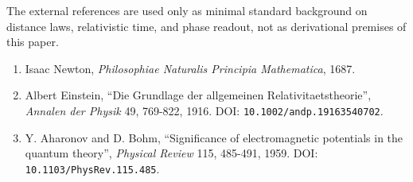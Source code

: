\documentclass[
]{article}
\providecommand{\tightlist}{%
  \setlength{\itemsep}{0pt}\setlength{\parskip}{0pt}}
\begin{document}
The external references are used only as minimal standard background on
distance laws, relativistic time, and phase readout, not as derivational
premises of this paper.

\begin{enumerate}
\def\labelenumi{\arabic{enumi}.}
\setcounter{enumi}{7}
\tightlist
\item
  Isaac Newton, \emph{Philosophiae Naturalis Principia Mathematica},
  1687.
\item
  Albert Einstein, ``Die Grundlage der allgemeinen
  Relativitaetstheorie'', \emph{Annalen der Physik} 49, 769-822, 1916.
  DOI: \texttt{10.1002/andp.19163540702}.
\item
  Y. Aharonov and D. Bohm, ``Significance of electromagnetic potentials
  in the quantum theory'', \emph{Physical Review} 115, 485-491, 1959.
  DOI: \texttt{10.1103/PhysRev.115.485}.
\end{enumerate}
\end{document}
